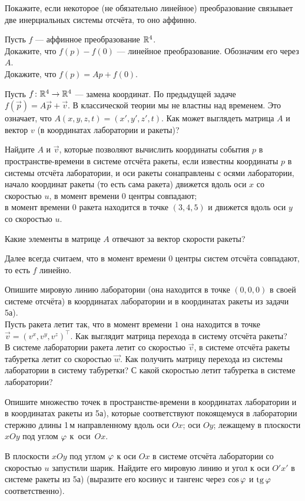 \documentclass[a4paper,12pt]{article}
\begin{document}
  Покажите, если некоторое (не обязательно линейное) преобразование связывает две инерциальных системы отсчёта, то оно аффинно.

  Пусть $f$ --- аффинное преобразование $\mathbb{R}^4$.\\
    Докажите, что $f(p)-f(0)$ --- линейное преобразование. Обозначим его через $A$.\\
    Докажите, что $f(p) = Ap + f(0)$.


  Пусть $f\colon\mathbb{R}^4\rightarrow\mathbb{R}^4$ --- замена координат. По предыдущей задаче $f(\vec{p}) = A\vec{p} + \vec{v}$. В классической теории мы не властны над временем. Это означает, что $A(x,y,z,t)=(x',y',z',t)$.
  Как может выглядеть матрица $A$ и вектор $v$ (в координатах лаборатории и ракеты)?

  Найдите $A$ и $\vec{v}$, которые позволяют вычислить координаты события $p$ в пространстве-времени в системе отсчёта ракеты, если известны координаты $p$ в системы отсчёта лаборатории, и
    оси ракеты сонаправлены с осями лаборатории, начало координат ракеты (то есть сама ракета) движется вдоль оси $x$ со скоростью $u$, в момент времени $0$ центры совпадают;
\\
    в момент времени $0$ ракета находится в точке $(3,4,5)$ и движется вдоль оси $y$ со скоростью $u$.

  Какие элементы в матрице $A$ отвечают за вектор скорости ракеты?


\medskip
Далее всегда считаем, что в момент времени $0$ центры систем отсчёта совпадают, то есть $f$ линейно.

    Опишите мировую линию лаборатории (она находится в точке $(0,0,0)$ в своей системе отсчёта) в координатах лаборатории и в координатах ракеты из задачи 5а).\\
    Пусть ракета летит так, что в момент времени $1$ она находится в точке $\vec{v}=(v^x,v^y,v^z)^\top$. Как выглядит матрица перехода в систему отсчёта ракеты?\\
    В системе лаборатории ракета летит со скоростью $\vec{v}$, в системе отсчёта ракеты табуретка летит со скоростью $\vec{w}$. Как получить матрицу перехода из системы лаборатории в систему табуретки? С какой скоростью летит табуретка в системе лаборатории?

  Опишите множество точек в пространстве-времени в координатах лаборатории и в координатах ракеты из 5а), которые соответствуют покоящемуся в лаборатории стержню длины 1\,м направленному вдоль  оси $Ox$;  оси $Oy$;  лежащему в плоскости $xOy$ под углом $\varphi$ к~оси~$Ox$.

  В плоскости $xOy$ под углом $\varphi$ к оси $Ox$ в системе отсчёта лаборатории со скоростью $u$ запустили шарик. Найдите его мировую линию и угол к оси $O'x'$ в системе ракеты из 5а) (выразите его косинус и тангенс через $\cos\varphi$ и $\tg\ph$ соответственно).

\end{document}
